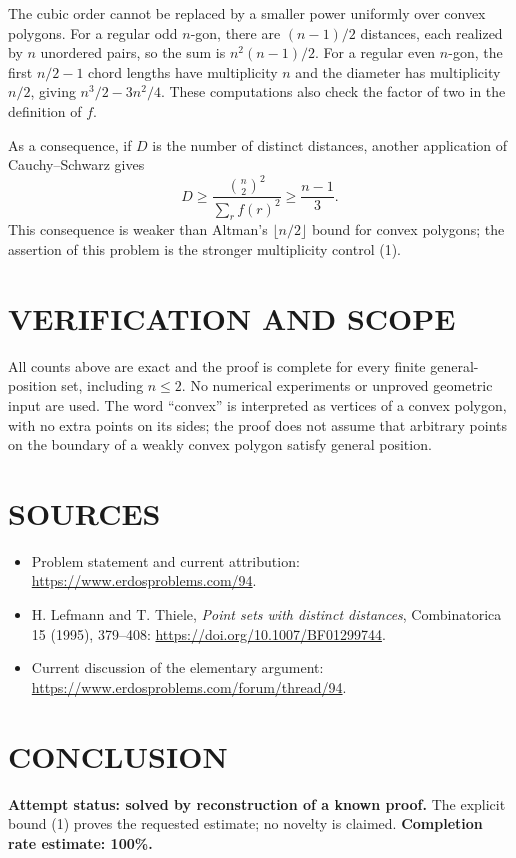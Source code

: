 The cubic order cannot be replaced by a smaller power uniformly over convex polygons. For a regular odd $n$-gon, there are $(n-1)/2$ distances, each realized by $n$ unordered pairs, so the sum is $n^2(n-1)/2$. For a regular even $n$-gon, the first $n/2-1$ chord lengths have multiplicity $n$ and the diameter has multiplicity $n/2$, giving $n^3/2-3n^2/4$. These computations also check the factor of two in the definition of $f$.

As a consequence, if $D$ is the number of distinct distances, another application of Cauchy--Schwarz gives
\[
D\geq\frac{\binom n2^2}{\sum_r f(r)^2}\geq\frac{n-1}{3}.
\]
This consequence is weaker than Altman's $\lfloor n/2\rfloor$ bound for convex polygons; the assertion of this problem is the stronger multiplicity control (1).

\section{VERIFICATION AND SCOPE}
All counts above are exact and the proof is complete for every finite general-position set, including $n\leq2$. No numerical experiments or unproved geometric input are used. The word ``convex'' is interpreted as vertices of a convex polygon, with no extra points on its sides; the proof does not assume that arbitrary points on the boundary of a weakly convex polygon satisfy general position.

\section{SOURCES}
\begin{itemize}
\item Problem statement and current attribution: \url{https://www.erdosproblems.com/94}.
\item H. Lefmann and T. Thiele, \emph{Point sets with distinct distances}, Combinatorica 15 (1995), 379--408: \url{https://doi.org/10.1007/BF01299744}.
\item Current discussion of the elementary argument: \url{https://www.erdosproblems.com/forum/thread/94}.
\end{itemize}

\section{CONCLUSION}
\textbf{Attempt status: solved by reconstruction of a known proof.} The explicit bound (1) proves the requested estimate; no novelty is claimed.
\textbf{Completion rate estimate: 100\%.}
